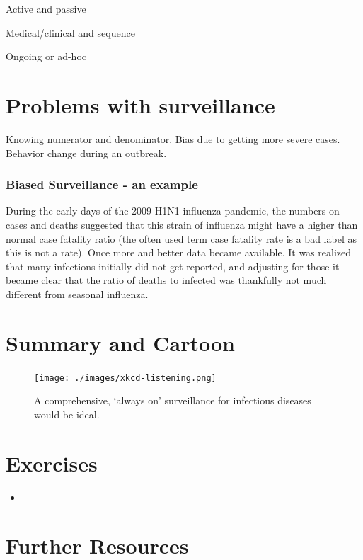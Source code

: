 \documentclass[
]{book}
\begin{document}
Active and passive

Medical/clinical and sequence

Ongoing or ad-hoc

\hypertarget{problems-with-surveillance}{%
\section{Problems with surveillance}\label{problems-with-surveillance}}

Knowing numerator and denominator. Bias due to getting more severe cases. Behavior change during an outbreak.

\hypertarget{myexamplebox}{%
\subsubsection{Biased Surveillance - an example}\label{myexamplebox}}

During the early days of the 2009 H1N1 influenza pandemic, the numbers on cases and deaths suggested that this strain of influenza might have a higher than normal case fatality ratio (the often used term case fatality rate is a bad label as this is not a rate). Once more and better data became available. It was realized that many infections initially did not get reported, and adjusting for those it became clear that the ratio of deaths to infected was thankfully not much different from seasonal influenza.

\hypertarget{summary-and-cartoon-9}{%
\section{Summary and Cartoon}\label{summary-and-cartoon-9}}

\begin{figure}
\centering
\texttt{[image: ./images/xkcd-listening.png]}
\caption{A comprehensive, `always on' surveillance for infectious diseases would be ideal.}
\end{figure}

\hypertarget{exercises-9}{%
\section{Exercises}\label{exercises-9}}

\begin{itemize}
\item
\end{itemize}

\hypertarget{further-resources-9}{%
\section{Further Resources}\label{further-resources-9}}
\end{document}
